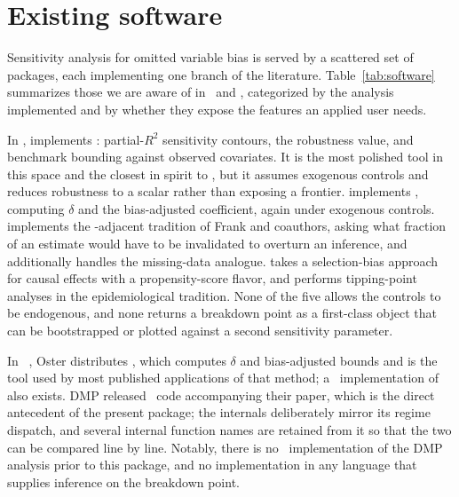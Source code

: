 \documentclass[article]{jss}\usepackage[]{graphicx}\usepackage[]{xcolor}
\newcommand{\Rlang}{\proglang{R}}
\newcommand{\Stata}{\proglang{Stata}}
\begin{document}
\section{Existing software}\label{sec:landscape}

Sensitivity analysis for omitted variable bias is served by a scattered set
of packages, each implementing one branch of the literature.
Table~\ref{tab:software} summarizes those we are aware of in \Rlang\ and
\Stata, categorized by the analysis implemented and by whether they expose
the features an applied user needs.

In \Rlang,  \citep{sensemakr} implements
\citet{Cinelli2020}: partial-$R^2$ sensitivity contours, the robustness
value, and benchmark bounding against observed covariates. It is the most
polished tool in this space and the closest in spirit to
, but it assumes exogenous controls and reduces
robustness to a scalar rather than exposing a frontier.
 \citep{robomit} implements \citet{Oster2019}, computing
$\delta$ and the bias-adjusted coefficient, again under exogenous controls.
 \citep{konfound} implements the \citet{Frolich2008}-adjacent
tradition of Frank and coauthors, asking what fraction of an estimate would
have to be invalidated to overturn an inference, and additionally handles
the missing-data analogue.  \citep{causalsens} takes a
selection-bias approach for causal effects with a propensity-score flavor,
and  \citep{tipr} performs tipping-point analyses in the
epidemiological tradition. None of the five allows the controls to be
endogenous, and none returns a breakdown point as a first-class object that
can be bootstrapped or plotted against a second sensitivity parameter.

In \Stata\ \citep{Stata}, Oster distributes , which computes
$\delta$ and bias-adjusted bounds and is the tool used by most published
applications of that method; a \Stata\ implementation of
\citet{Cinelli2020} also exists. DMP released \Stata\ code accompanying
their paper, which is the direct antecedent of the present package; the
 internals deliberately mirror its regime dispatch, and
several internal function names are retained from it so that the two can be
compared line by line. Notably, there is no \Rlang\ implementation of the
DMP analysis prior to this package, and no implementation in any language
that supplies inference on the breakdown point.
\end{document}
